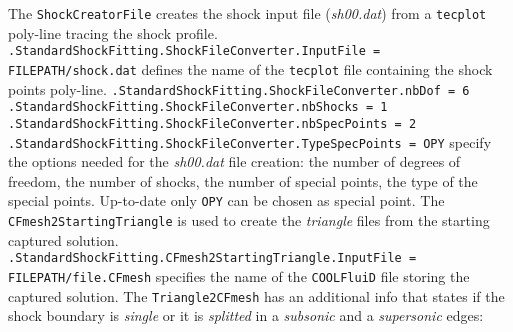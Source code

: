 \documentclass[11pt,a4paper,oneside]{article}
\begin{document}
\newline
The \texttt{ShockCreatorFile} creates the shock input file (\textit{sh00.dat}) from a \texttt{tecplot} poly-line tracing the shock profile.
\newline
\newline
\hspace*{1cm} \texttt{.StandardShockFitting.ShockFileConverter.InputFile = FILEPATH/shock.dat}
\newline
\newline
defines the name of the \texttt{tecplot} file containing the shock points poly-line.
\newline
\newline
\hspace*{1cm} \texttt{.StandardShockFitting.ShockFileConverter.nbDof = 6}
\newline
\hspace*{1cm} \texttt{.StandardShockFitting.ShockFileConverter.nbShocks = 1}
\newline
\hspace*{1cm} \texttt{.StandardShockFitting.ShockFileConverter.nbSpecPoints = 2}
\newline
\hspace*{1cm} \texttt{.StandardShockFitting.ShockFileConverter.TypeSpecPoints = OPY}
\newline
\newline
specify the options needed for the \textit{sh00.dat} file creation: the number of degrees of freedom, the number of shocks, the number of special points, the type of the special points.
\newline
Up-to-date only \texttt{OPY} can be chosen as special point.
\newline
\newline
The \texttt{CFmesh2StartingTriangle} is used to create the \textit{triangle} files from the starting captured solution.
\newline
\newline
\hspace*{1cm} \texttt{.StandardShockFitting.CFmesh2StartingTriangle.InputFile = FILEPATH/file.CFmesh}
\newline
\newline
specifies the name of the \texttt{COOLFluiD} file storing the captured solution.
\newline
\newline
The \texttt{Triangle2CFmesh} has an additional info that states if the shock boundary is \textit{single} or it is \textit{splitted} in a \textit{subsonic} and a \textit{supersonic} edges:
\end{document}
